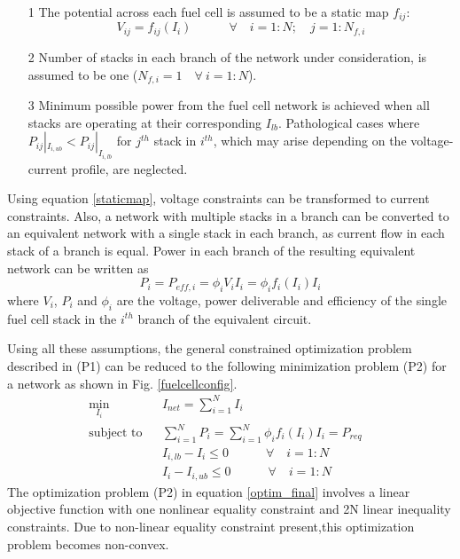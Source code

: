 \documentclass[twocolumn]{autart}
\begin{document}
\begin{itemize}
\item[1] The potential across each fuel cell is assumed to be a static map $f_{ij}$: 
\begin{equation}
V_{ij}= f_{ij}(I_i)\qquad \quad
\forall \quad i=1:N; \quad j=1:N_{f,i}
\label{staticmap}
\end{equation}
\item[2] Number of stacks in each branch of the network under consideration, is assumed to be one ($N_{f,i} = 1 \quad \forall \ i=1:N$).
\item[3] Minimum possible power from the fuel cell network is achieved when all stacks are operating at their corresponding $I_{lb}$. Pathological cases where $P_{ij}|_{I_{i,ub}} < P_{ij}|_{I_{i,lb}}$ for $j^{th}$ stack in $i^{th}$, which may arise depending on the voltage-current profile, are neglected. 
\end{itemize}
Using equation \eqref{staticmap}, voltage constraints can be transformed to current constraints. Also, a network with multiple stacks in a branch can be converted to an equivalent network with a single stack in each branch, as current flow in each stack of a branch is equal. Power in each branch of the resulting equivalent network can be written as 
\begin{equation}
P_i = P_{eff,i}  = \phi_i V_i I_i   =  \phi_i f_i(I_i) I_i 
\label{pow}
\end{equation}
where $V_i$, $P_i$ and $\phi_i$ are the voltage, power deliverable and efficiency of the single fuel cell stack in the $i^{th}$ branch of the equivalent circuit.

Using all these assumptions, the general constrained optimization problem described in (P1) can be reduced to the following minimization problem (P2) for a network as shown in Fig. \ref{fuelcellconfig}.
\begin{subequations}
\label{optim_final}
\begin{align}
& \underset{I_{i}}{\text{min}}
& & I_{net} = \sum_{i=1}^{N}I_{i}  \\
& \text{subject to} & &  \sum_{i=1}^{N} P_{i} = \sum_{i=1}^{N} \phi_i f_i(I_i) I_{i} = P_{req} \label{eq_const}\\
& & & I_{i,lb}-I_{i} \leq 0 \qquad \quad \forall \quad i=1:N & &\\
& & & I_{i} -I_{i,ub}\leq 0 \qquad \quad \forall \quad i=1:N & &
\end{align}
\end{subequations}
The optimization problem (P2) in equation \eqref{optim_final} involves a linear objective function with one nonlinear equality constraint and 2N linear inequality constraints. Due to non-linear equality constraint present,this optimization problem becomes non-convex. 
\end{document}

